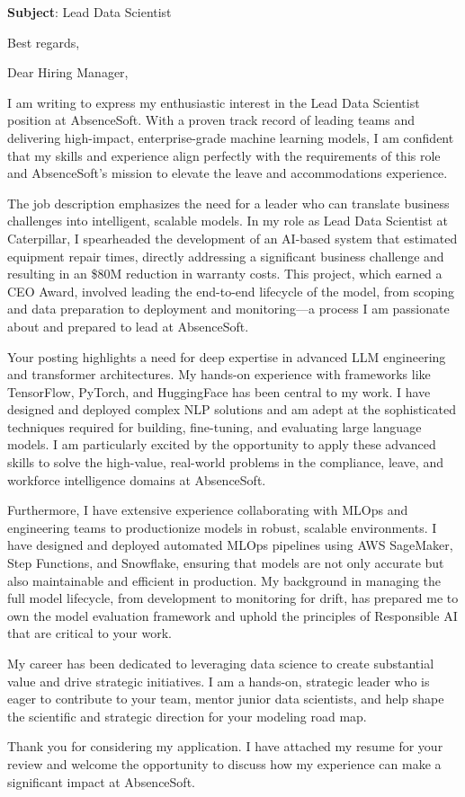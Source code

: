 \documentclass[11pt,a4paper,roman]{moderncv}
\newcommand{\jobtitle}{Lead Data Scientist}
\begin{document}
\date{\today}
\opening{\textbf{Subject}: \jobtitle}
\closing{Best regards,}
\makelettertitle

\vspace{0.25cm}


Dear Hiring Manager,

I am writing to express my enthusiastic interest in the Lead Data Scientist position at AbsenceSoft. With a proven track record of leading teams and delivering high-impact, enterprise-grade machine learning models, I am confident that my skills and experience align perfectly with the requirements of this role and AbsenceSoft's mission to elevate the leave and accommodations experience.

The job description emphasizes the need for a leader who can translate business challenges into intelligent, scalable models. In my role as Lead Data Scientist at Caterpillar, I spearheaded the development of an AI-based system that estimated equipment repair times, directly addressing a significant business challenge and resulting in an \$80M reduction in warranty costs. This project, which earned a CEO Award, involved leading the end-to-end lifecycle of the model, from scoping and data preparation to deployment and monitoring—a process I am passionate about and prepared to lead at AbsenceSoft.

Your posting highlights a need for deep expertise in advanced LLM engineering and transformer architectures. My hands-on experience with frameworks like TensorFlow, PyTorch, and HuggingFace has been central to my work. I have designed and deployed complex NLP solutions and am adept at the sophisticated techniques required for building, fine-tuning, and evaluating large language models. I am particularly excited by the opportunity to apply these advanced skills to solve the high-value, real-world problems in the compliance, leave, and workforce intelligence domains at AbsenceSoft.

Furthermore, I have extensive experience collaborating with MLOps and engineering teams to productionize models in robust, scalable environments. I have designed and deployed automated MLOps pipelines using AWS SageMaker, Step Functions, and Snowflake, ensuring that models are not only accurate but also maintainable and efficient in production. My background in managing the full model lifecycle, from development to monitoring for drift, has prepared me to own the model evaluation framework and uphold the principles of Responsible AI that are critical to your work.

My career has been dedicated to leveraging data science to create substantial value and drive strategic initiatives. I am a hands-on, strategic leader who is eager to contribute to your team, mentor junior data scientists, and help shape the scientific and strategic direction for your modeling road map.

Thank you for considering my application. I have attached my resume for your review and welcome the opportunity to discuss how my experience can make a significant impact at AbsenceSoft.


 
\makeletterclosing
\end{document}

